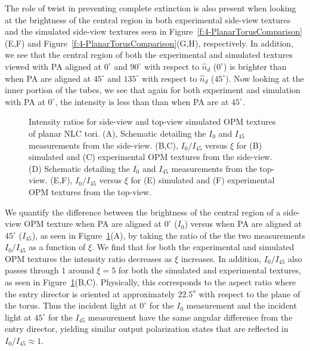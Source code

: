 The role of twist in preventing complete extinction is also present when looking at the brightness of the central region in both experimental side-view textures and the simulated side-view textures seen in Figure~\ref{f:4-PlanarTorusComparison}(E,F) and Figure~\ref{f:4-PlanarTorusComparison}(G,H), respectively.
In addition, we see that the central region of both the experimental and simulated textures viewed with PA aligned at $0^{\circ}$ and $90^{\circ}$ with respect to $\hat{n}_d$ ($0^{\circ}$) is brighter than when PA are aligned at $45^{\circ}$ and $135^{\circ}$ with respect to $\hat{n}_d$ ($45^{\circ}$).
Now looking at the inner portion of the tubes, we see that again for both experiment and simulation with PA at $0^{\circ}$, the intensity is less than than when PA are at $45^{\circ}$.
\begin{figure}
\centering
\caption{Intensity ratios for side-view and top-view simulated OPM textures of planar NLC tori.
(A), Schematic detailing the $I_0$ and $I_{45}$ measurements from the side-view.
(B,C), $I_0/I_{45}$ versus $\xi$ for (B) simulated and (C) experimental OPM textures from the side-view.
(D) Schematic detailing the $I_0$ and $I_{45}$ measurements from the top-view.
(E,F), $I_0/I_{45}$ versus $\xi$ for (E) simulated and (F) experimental OPM textures from the top-view. }\label{f:4-PlanarIntRatio}
\end{figure}

We quantify the difference between the brightness of the central region of a side-view OPM texture when PA are aligned at $0^{\circ}$ ($I_0$) versus when PA are aligned at $45^{\circ}$ ($I_{45}$), as seen in Figure~\ref{f:4-PlanarIntRatio}(A), by taking the ratio of the the two measurements $I_0/I_{45}$ as a function of $\xi$.
We find that for both the experimental and simulated OPM textures the intensity ratio decreases as $\xi$ increases. In addition, $I_0/I_{45}$ also passes through 1 around $\xi = 5$ for both the simulated and experimental textures, as seen in Figure~\ref{f:4-PlanarIntRatio}(B,C).
Physically, this corresponds to the aspect ratio where the entry director is oriented at approximately $22.5^o$ with respect to the plane of the torus.
Thus the incident light at $0^{\circ}$ for the $I_0$ measurement and the incident light at $45^{\circ}$ for the $I_{45}$ measurement have the same angular difference from the entry director, yielding similar output polarization states that are reflected in $I_0/I_{45} \approx 1$.


